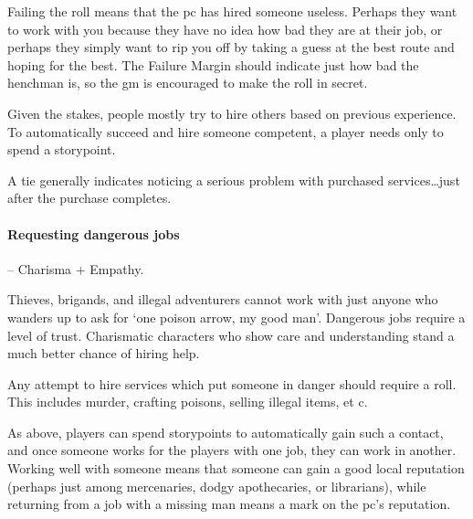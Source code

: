 \begin{multicols}{2}
Failing the roll means that the \gls{pc} has hired someone useless.
Perhaps they want to work with you because they have no idea how bad they are at their job, or perhaps they simply want to rip you off by taking a guess at the best route and hoping for the best.
The Failure Margin should indicate just how bad the henchman is, so the \gls{gm} is encouraged to make the roll in secret.

Given the stakes, people mostly try to hire others based on previous experience.
To automatically succeed and hire someone competent, a player needs only to spend a \gls{storypoint}.

A tie generally indicates noticing a serious problem with purchased services\ldots just after the purchase completes.

\paragraph{Requesting dangerous jobs} -- Charisma + Empathy.


Thieves, brigands, and illegal adventurers cannot work with just anyone who wanders up to ask for `one poison arrow, my good man'.
Dangerous jobs require a level of trust.
Charismatic characters who show care and understanding stand a much better chance of hiring help.

Any attempt to hire services which put someone in danger should require a roll.
This includes murder, crafting poisons, selling illegal items, et c.

As above, players can spend \glspl{storypoint} to automatically gain such a contact, and once someone works for the players with one job, they can work in another.
Working well with someone means that someone can gain a good local reputation (perhaps just among mercenaries, dodgy apothecaries, or librarians), while returning from a job with a missing man means a mark on the \gls{pc}'s reputation.


\end{multicols}
